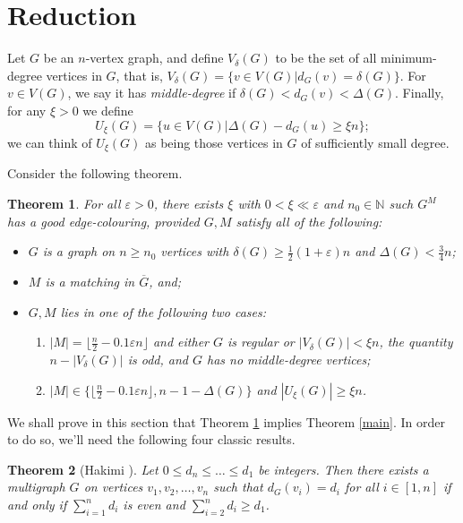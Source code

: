 \documentclass[11pt, oneside]{article}
\newcommand{\ve}{\varepsilon}
\newtheorem{theorem}{Theorem}
\begin{document}
\section{Reduction}


Let $G$ be an $n$-vertex graph, and define $V_\delta(G)$ to be the set of all minimum-degree vertices in $G$, that is, $V_\delta(G)=\{v\in V(G)| d_G(v)=\delta(G)\}$. For $v\in V(G)$, we say it has \emph{middle-degree} if $\delta(G)<d_G(v)<\Delta(G)$. Finally, for any $\xi>0$ we define
$$U_\xi(G)=\{u\in V(G)| \Delta(G)-d_G(u)\geq \xi n\};$$
we can think of $U_\xi(G)$ as being those vertices in $G$ of sufficiently small degree. 

Consider the following theorem.

\begin{theorem}\label{thm:reduced}
    For all $\varepsilon>0$, there exists $\xi $ with  $0<\xi  \ll \ve $ and $ n_0\in\mathbb{N}$ such $G^M$ has a good edge-colouring, provided $G, M$ satisfy all of the following:
    \begin{itemize}
    \item[(a)]  $G$ is a graph on $n\geq n_0$ vertices with $\delta(G)\geq\tfrac{1}{2}(1 + \varepsilon)n$ and $\Delta(G)<\frac{3}{4}n$;
    \item[(b)] $M$ is a matching in $\overline{G}$, and;
    \item[(c)] $G, M$ lies in one of the following two cases:
     \begin{enumerate}[(1)]
        \item $|M|=\lfloor \frac{n}{2} - 0.1 \ve n \rfloor$ and either $G$ is regular or $|V_\delta(G)|<\xi n$, the quantity $n-|V_\delta(G)|$ is odd, and $G$ has no middle-degree vertices;
  \item $|M|\in\{\lfloor \frac{n}{2} - 0.1 \ve n \rfloor, n-1-\Delta(G) \}$ and $|U_\xi(G)| \ge \xi n$.
    \end{enumerate}
    \end{itemize}
\end{theorem}


We shall prove in this section that Theorem \ref{thm:reduced} implies Theorem \ref{main}. In order to do so, we'll need the following four classic results. 

\begin{theorem}[Hakimi \cite{H1962}]\label{thm:degree-sequence-multigraph} Let $0\leq d_n\leq \ldots \leq d_1$ be integers. Then there exists a multigraph $G$ on vertices $v_1,v_2,\ldots,v_n$ such that $d_{G}(v_i)=d_i$ for all $i\in [1,n]$ if and only if $\sum\limits_{i=1}^{n}d_i$ is even and $\sum\limits_{i=2}^{n}d_i\geq d_1$.
\end{theorem}
\end{document}
